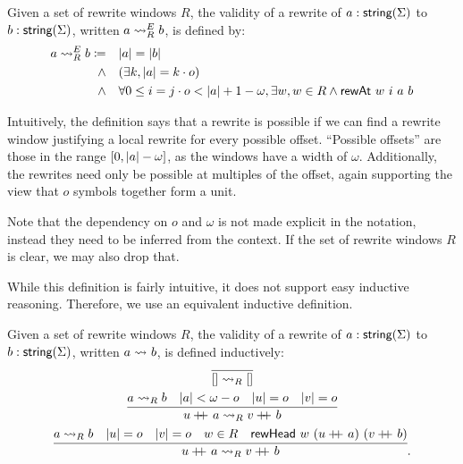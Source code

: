 \begin{definition}
  Given a set of rewrite windows $R$, the validity of a rewrite of $a : \textsf{string}{(\Sigma)}$ to $b : \textsf{string}{(\Sigma)}$, written $a \rightsquigarrow_{R}^E b$, is defined by:
  \begin{align*}
    a \rightsquigarrow_{R}^E b \coloneqq \quad& |a| = |b| \\
    \land \quad & (\exists k, |a| = k \cdot o) \\
    \land \quad & \forall 0 \le i = j \cdot o < |a| + 1 - \omega, \exists w, w \in R \land \textsf{rewAt}~w~i~a~b 
  \end{align*}
\end{definition}

Intuitively, the definition says that a rewrite is possible if we can find a rewrite window justifying a local rewrite for every possible offset. ``Possible offsets'' are those in the range $[0, |a| - \omega]$, as the windows have a width of $\omega$. Additionally, the rewrites need only be possible at multiples of the offset, again supporting the view that $o$ symbols together form a unit.

Note that the dependency on $o$ and $\omega$ is not made explicit in the notation, instead they need to be inferred from the context. If the set of rewrite windows $R$ is clear, we may also drop that.

While this definition is fairly intuitive, it does not support easy inductive reasoning. Therefore, we use an equivalent inductive definition.

\begin{definition}[Validity] 
  Given a set of rewrite windows $R$, the validity of a rewrite of $a : \textsf{string}{(\Sigma)}$ to $b : \textsf{string}{(\Sigma)}$, written $a \rightsquigarrow_{} b$, is defined inductively:  
  \begin{gather*}
    \infer{\nil \strent{R} \nil}{} \\
    \infer{u\concat{} a \strent{R} v \concat{} b}{a \strent{R} b \quad \length{a} < \omega - o \quad \length{u} = o \quad \length{v} = o} \\
    \infer{u \concat{} a \strent{R} v \concat{} b}{a \strent{R} b \quad \length{u} = o \quad \length{v} = o \quad w \in R \quad \rewHead{w}{u\concat{}a}{v \concat{} b}}.
  \end{gather*}
\end{definition}

